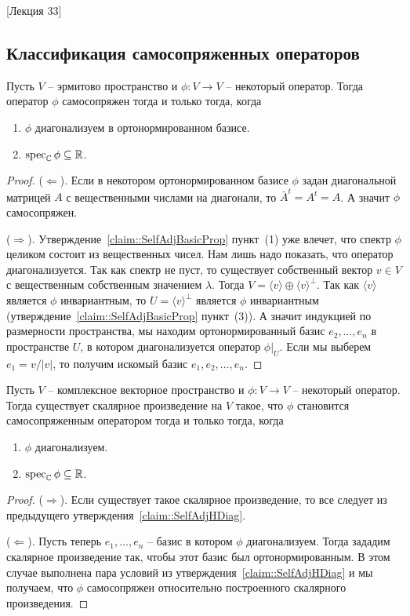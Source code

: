 [Лекция 33]

\subsection{Классификация самосопряженных операторов}

\begin{claim}\label{claim::SelfAdjHDiag}
Пусть $V$ -- эрмитово пространство и $\phi\colon V\to V$ -- некоторый оператор. Тогда оператор $\phi$ самосопряжен тогда и только тогда, когда
\begin{enumerate}
\item $\phi$ диагонализуем в ортонормированном базисе.
\item $\operatorname{spec}_\mathbb C\phi\subseteq \mathbb R$.
\end{enumerate}
\end{claim}
\begin{proof}
($\Leftarrow$). Если в некотором ортонормированном базисе $\phi$ задан диагональной матрицей $A$ с вещественными числами на диагонали, то $\bar A^t = A^t = A$. А значит $\phi$ самосопряжен.

($\Rightarrow$). Утверждение~\ref{claim::SelfAdjBasicProp} пункт~(1) уже влечет, что спектр $\phi$ целиком состоит из вещественных чисел. Нам лишь надо показать, что оператор диагонализуется. Так как спектр не пуст, то существует собственный вектор $v\in V$ с вещественным собственным значением $\lambda$. Тогда $V = \langle v\rangle \oplus \langle v\rangle^\bot$. Так как $\langle v \rangle$ является $\phi$ инвариантным, то $U = \langle v\rangle^\bot$ является $\phi$ инвариантным (утверждение~\ref{claim::SelfAdjBasicProp} пункт~(3)). А значит индукцией по размерности пространства, мы находим ортонормированный базис $e_2,\ldots,e_n$ в пространстве $U$, в котором диагонализуется оператор $\phi|_U$. Если мы выберем $e_1 = v / |v|$, то получим искомый базис $e_1,e_2,\ldots,e_n$.
\end{proof}

\begin{claim}\label{claim::SelfAdjHExists}
Пусть $V$ -- комплексное векторное пространство и $\phi\colon V\to V$ -- некоторый оператор. Тогда существует скалярное произведение на $V$ такое, что $\phi$ становится самосопряженным оператором тогда и только тогда, когда
\begin{enumerate}
\item $\phi$ диагонализуем.
\item $\operatorname{spec}_\mathbb C\phi\subseteq \mathbb R$.
\end{enumerate}
\end{claim}
\begin{proof}
($\Rightarrow$). Если существует такое скалярное произведение, то все следует из предыдущего утверждения~\ref{claim::SelfAdjHDiag}.

($\Leftarrow$). Пусть теперь $e_1,\ldots,e_n$ -- базис в котором $\phi$ диагонализуем. Тогда зададим скалярное произведение так, чтобы этот базис был ортонормированным. В этом случае выполнена пара условий из утверждения~\ref{claim::SelfAdjHDiag} и мы получаем, что $\phi$ самосопряжен относительно построенного скалярного произведения.
\end{proof}


